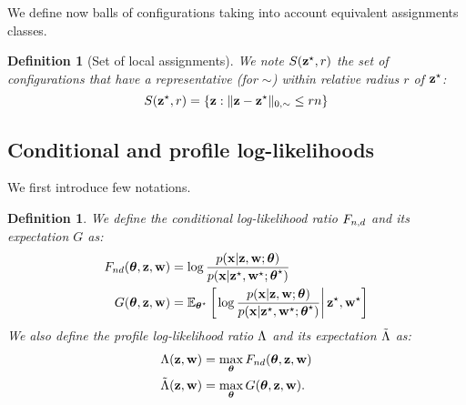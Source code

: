 \documentclass[]{imsart}
\newcommand{\1}{\mathds{1}}
\numberwithin{equation}{section}
\theoremstyle{plain}
\newtheorem{dof}[thm]{Definition}
\theoremstyle{remark}
\begin{document}
We define now balls of configurations taking into account equivalent assignments classes.
\begin{dof}[Set of local assignments]
  \label{prop:small-deviations-profile-likelihood}
  We note $S(\mathbf{z}^\star, r)$ the set of configurations that have a representative (for $\sim$) within relative radius $r$ of $\mathbf{z}^\star$:
  \begin{equation*}
    S(\bzs, r) = \left\{ \bz : \|\bz - \bzs\|_{0, \sim} \leq r \n \right\}
  \end{equation*}
\end{dof}

\subsection{Conditional and profile log-likelihoods}
\label{sec:cond-and-prof-likelihood} 
%
We first introduce few notations.

\begin{dof}
\label{def:conditional-profile-likelihood}
We define the conditional log-likelihood ratio $F_{n,d}$ and its expectation $G$ as:
\begin{equation}
  \label{eq:conditional-likelihood}
  \begin{aligned}
    \Fnd(\btheta, \bz, \bw) & = \log \frac{\prob(\bx| \bz,\bw;\btheta)}{\prob(\bx| \bzs,\bws;\bthetas)} \\
    \G(\btheta, \bz, \bw) & = \Esp_{\bthetas} \left[ \left. \log \frac{\prob(\bx| \bz,\bw;\btheta)}{\prob(\bx| \bzs,\bws;\bthetas)} \right| \bzs, \bws  \right] \\
  \end{aligned}
\end{equation}
We also define the profile log-likelihood ratio $\Lambda$ and its expectation $\tilde{\Lambda}$ as:
\begin{equation}
  \label{eq:profile-likelihood}
  \begin{aligned}
    \Lamb(\bz, \bw) & = \max_{\btheta} \Fnd(\btheta, \bz, \bw)  \\
    \Lambtilde(\bz, \bw) & = \max_{\btheta} \G(\btheta, \bz, \bw).
  \end{aligned}
\end{equation}
\end{dof}
\end{document}
